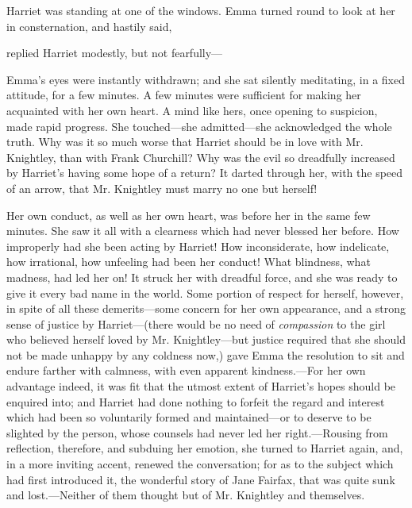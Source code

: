 Harriet was standing at one of the windows. Emma turned round to look at her in consternation, and hastily said,


 replied Harriet modestly, but not fearfully---

Emma's eyes were instantly withdrawn; and she sat silently meditating, in a fixed attitude, for a few minutes. A few minutes were sufficient for making her acquainted with her own heart. A mind like hers, once opening to suspicion, made rapid progress. She touched---she admitted---she acknowledged the whole truth. Why was it so much worse that Harriet should be in love with Mr. Knightley, than with Frank Churchill? Why was the evil so dreadfully increased by Harriet's having some hope of a return? It darted through her, with the speed of an arrow, that Mr. Knightley must marry no one but herself!

Her own conduct, as well as her own heart, was before her in the same few minutes. She saw it all with a clearness which had never blessed her before. How improperly had she been acting by Harriet! How inconsiderate, how indelicate, how irrational, how unfeeling had been her conduct! What blindness, what madness, had led her on! It struck her with dreadful force, and she was ready to give it every bad name in the world. Some portion of respect for herself, however, in spite of all these demerits---some concern for her own appearance, and a strong sense of justice by Harriet---(there would be no need of {\em compassion} to the girl who believed herself loved by Mr. Knightley---but justice required that she should not be made unhappy by any coldness now,) gave Emma the resolution to sit and endure farther with calmness, with even apparent kindness.---For her own advantage indeed, it was fit that the utmost extent of Harriet's hopes should be enquired into; and Harriet had done nothing to forfeit the regard and interest which had been so voluntarily formed and maintained---or to deserve to be slighted by the person, whose counsels had never led her right.---Rousing from reflection, therefore, and subduing her emotion, she turned to Harriet again, and, in a more inviting accent, renewed the conversation; for as to the subject which had first introduced it, the wonderful story of Jane Fairfax, that was quite sunk and lost.---Neither of them thought but of Mr. Knightley and themselves.

